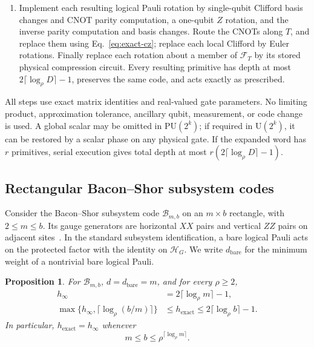 \documentclass[aps,prl,reprint,notitlepage,nofootinbib,nobibnotes]{revtex4-2}
\newtheorem{proposition}{Proposition}
\newcommand{\HH}{\mathcal H}
\newcommand{\UU}{\mathrm U}
\newcommand{\PU}{\mathrm{PU}}
\newcommand{\id}{I}
\begin{document}
\begin{enumerate}
\[
 (\id-\Pi_y)+\Pi_y\overline X_t
   =e^{i\pi\Pi_y/2}e^{-i\pi\Pi_y\overline X_t/2}.
\]
The final diagonal phases use Eq.~\eqref{eq:control-projector} with all logical bits in \(B\). Thus the phase of a two-level block is retained even when it is relative to the other basis states.
\item Implement each resulting logical Pauli rotation by single-qubit Clifford basis changes and CNOT parity computation, a one-qubit \(Z\) rotation, and the inverse parity computation and basis changes. Route the CNOTs along \(T\), and replace them using Eq.~\eqref{eq:exact-cz}; replace each local Clifford by Euler rotations. Finally replace each rotation about a member of \(\mathcal F_T\) by its stored physical compression circuit. Every resulting primitive has depth at most \(2\lceil\log_\rho D\rceil-1\), preserves the same code, and acts exactly as prescribed.
\end{enumerate}
All steps use exact matrix identities and real-valued gate parameters. No limiting product, approximation tolerance, ancillary qubit, measurement, or code change is used. A global scalar may be omitted in \(\PU(2^k)\); if required in \(\UU(2^k)\), it can be restored by a scalar phase on any physical gate. If the expanded word has \(r\) primitives, serial execution gives total depth at most \(r(2\lceil\log_\rho D\rceil-1)\).

\subsection*{Rectangular Bacon--Shor subsystem codes}

Consider the Bacon--Shor subsystem code \(\mathcal B_{m,b}\) on an \(m\times b\) rectangle, with \(2\le m\le b\). Its gauge generators are horizontal \(XX\) pairs and vertical \(ZZ\) pairs on adjacent sites~\cite{Bacon,BaconCasaccino}. In the standard subsystem identification, a bare logical Pauli acts on the protected factor with the identity on \(\HH_G\). We write \(d_{\mathrm{bare}}\) for the minimum weight of a nontrivial bare logical Pauli.

\begin{samepage}
\begin{proposition}\label{prop:bacon-shor-saturation}
For \(\mathcal B_{m,b}\), \(d=d_{\mathrm{bare}}=m\), and for every \(\rho\ge2\),
\begin{align}
 h_\infty &= 2\lceil\log_\rho m\rceil-1,
 \label{eq:bacon-shor-onset}\\
 \max\{h_\infty,\lceil\log_\rho(b/m)\rceil\}
 &\le h_{\mathrm{exact}}
 \le 2\lceil\log_\rho b\rceil-1.
 \label{eq:bacon-shor-exact-bounds}
\end{align}
In particular, \(h_{\mathrm{exact}}=h_\infty\) whenever
\begin{equation}\label{eq:bacon-shor-saturation}
 m\le b\le \rho^{\lceil\log_\rho m\rceil}.
\end{equation}
\end{proposition}
\end{samepage}
\end{document}
